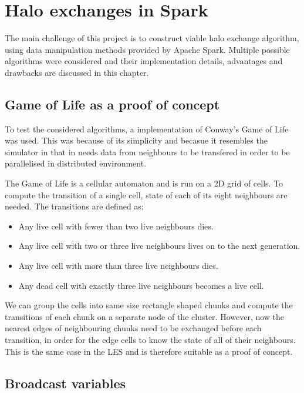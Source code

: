 \documentclass{l4proj}
\begin{document}
\chapter{Halo exchanges in Spark}
\label{chap:halos}

The main challenge of this project is to construct viable halo exchange algorithm, using 
data manipulation methods provided by Apache Spark. Multiple possible algorithms were 
considered and their implementation details, advantages and drawbacks are discussed in this chapter.

\section{Game of Life as a proof of concept}
To test the considered algorithms, a implementation of Conway's Game of Life was used.
This was because of its simplicity and becasue it resembles the simulator in that
in needs data from neighbours to be transfered in order to be parallelised in 
distributed environment.

The Game of Life is a cellular automaton and is run on a 2D grid of cells. To compute
the transition of a single cell, state of each of its eight neighbours are needed.
The transitions are defined as:

\begin{itemize} 
\item Any live cell with fewer than two live neighbours dies.
\item Any live cell with two or three live neighbours lives on to the next generation.
\item Any live cell with more than three live neighbours dies.
\item Any dead cell with exactly three live neighbours becomes a live cell.
\end{itemize}

We can group the cells into same size rectangle shaped chunks and compute the transitions of each
chunk on a separate node of the cluster. However, now the nearest edges of neighbouring
chunks need to be exchanged before each transition, in order for the edge cells to know
the state of all of their neighbours. This is the same case in the LES and is therefore
suitable as a proof of concept.

\section{Broadcast variables}
\label{chap:broadcast}
\end{document}
